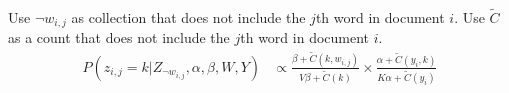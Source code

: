 ~\\ Use $\neg w_{i,j}$ as collection that does not include the $j$th word in document $i$. Use $\widetilde{C}$ as a count that does not include the $j$th word in document $i$.
\begin{align}
P(z_{i,j} = k | Z_{\neg w_{i,j}}, \alpha, \beta, W, Y) &\propto \frac{\beta + \widetilde{C}(k, w_{i,j})}{V\beta + \widetilde{C}(k)} \times \frac{\alpha + \widetilde{C}(y_i, k)}{K\alpha + \widetilde{C}(y_i)}
\end{align}